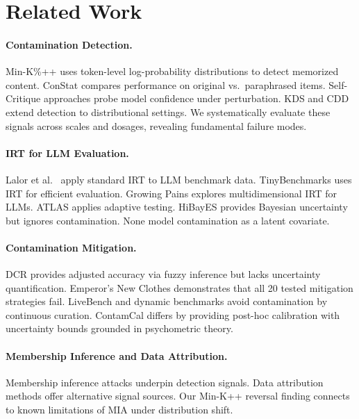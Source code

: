 \documentclass[11pt,a4paper]{article}
\begin{document}
\section{Related Work}

\paragraph{Contamination Detection.}
Min-K\%++ \cite{shi2024detecting} uses token-level log-probability distributions to detect memorized content. ConStat \cite{oren2024proving} compares performance on original vs.\ paraphrased items. Self-Critique approaches probe model confidence under perturbation. KDS \cite{dong2024generalization} and CDD \cite{shi2024cdd} extend detection to distributional settings. We systematically evaluate these signals across scales and dosages, revealing fundamental failure modes.

\paragraph{IRT for LLM Evaluation.}
Lalor et al.\ \cite{lalor2024benchmarking} apply standard IRT to LLM benchmark data. TinyBenchmarks \cite{polo2024tinybenchmarks} uses IRT for efficient evaluation. Growing Pains \cite{burnell2023rethinking} explores multidimensional IRT for LLMs. ATLAS applies adaptive testing. HiBayES \cite{zhuang2024hibayes} provides Bayesian uncertainty but ignores contamination. None model contamination as a latent covariate.

\paragraph{Contamination Mitigation.}
DCR \cite{oren2024proving} provides adjusted accuracy via fuzzy inference but lacks uncertainty quantification. Emperor's New Clothes \cite{yang2025emperor} demonstrates that all 20 tested mitigation strategies fail. LiveBench \cite{white2024livebench} and dynamic benchmarks avoid contamination by continuous curation. ContamCal differs by providing post-hoc calibration with uncertainty bounds grounded in psychometric theory.

\paragraph{Membership Inference and Data Attribution.}
Membership inference attacks \cite{shokri2017membership,carlini2022quantifying} underpin detection signals. Data attribution methods \cite{pruthi2020estimating,park2023trak} offer alternative signal sources. Our Min-K++ reversal finding connects to known limitations of MIA under distribution shift.
\end{document}
